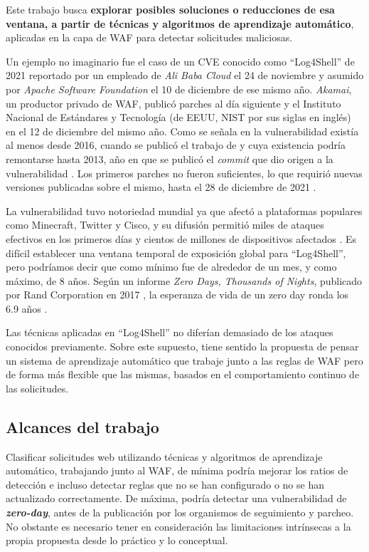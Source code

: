 \documentclass[12pt, a4paper]{article}
\begin{document}
Este trabajo busca \textbf{explorar posibles soluciones o reducciones de esa ventana, a partir de técnicas y algoritmos de aprendizaje automático}, aplicadas en la capa de WAF para detectar solicitudes maliciosas.

Un ejemplo no imaginario fue el caso de un CVE conocido como \enquote{Log4Shell} de 2021 reportado por un empleado de \textit{Ali Baba Cloud} el 24 de noviembre y asumido por \textit{Apache Software Foundation} el 10 de diciembre de ese mismo año. \textit{Akamai}, un productor privado de WAF, publicó parches al día siguiente \cite{akamai2021log4j} y el Instituto Nacional de Estándares y Tecnología (de EEUU, NIST por sus siglas en inglés) en \cite{nvd2021-44228} el 12 de diciembre del mismo año. Como se señala en \cite{hiesgen2022race} la vulnerabilidad existía al menos desde 2016, cuando se publicó el trabajo de \cite{munoz2016jndi} y cuya existencia podría remontarse hasta 2013, año en que se publicó el \textit{commit} que dio origen a la vulnerabilidad \cite{apache2013log4j2commit}. Los primeros parches no fueron suficientes, lo que requirió nuevas versiones publicadas sobre el mismo, hasta el 28 de diciembre de 2021 \cite{nvd2021-44832}.

La vulnerabilidad tuvo notoriedad mundial ya que afectó a plataformas populares como Minecraft, Twitter y Cisco, y su difusión permitió miles de ataques efectivos en los primeros días y cientos de millones de dispositivos afectados \cite{unraveling2025log4shell}. Es difícil establecer una ventana temporal de exposición global para \enquote{Log4Shell}, pero podríamos decir que como mínimo fue de alrededor de un mes, y como máximo, de 8 años. Según un informe \textit{Zero Days, Thousands of Nights}, publicado por Rand Corporation en 2017 , la esperanza de vida de un zero day ronda los 6.9 años \cite{ablon2017zero}.

Las técnicas aplicadas en \enquote{Log4Shell} no diferían demasiado de los ataques conocidos previamente. Sobre este supuesto, tiene sentido la propuesta de pensar un sistema de aprendizaje automático que trabaje junto a las reglas de WAF pero de forma más flexible que las mismas, basados en el comportamiento continuo de las solicitudes.

\subsection{Alcances del trabajo}

\vspace{0.2cm}
Clasificar solicitudes web utilizando técnicas y algoritmos de aprendizaje automático, trabajando junto al WAF, de mínima podría mejorar los ratios de detección e incluso detectar reglas que no se han configurado o no se han actualizado correctamente. De máxima, podría detectar una vulnerabilidad de \textbf{\textit{zero-day}}, antes de la publicación por los organismos de seguimiento y parcheo. No obstante es necesario tener en consideración las limitaciones intrínsecas a la propia propuesta desde lo práctico y lo conceptual.
\end{document}
